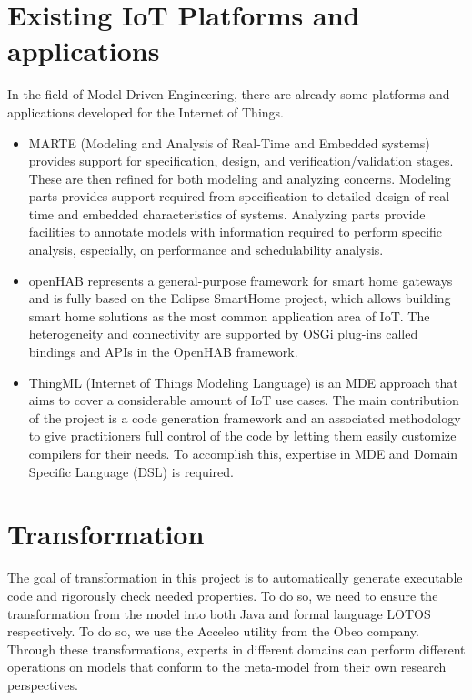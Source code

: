 \documentclass[11pt, oneside]{article}   	%
\begin{document}
\section {Existing IoT Platforms and applications}
\indent \par In the field of Model-Driven Engineering, there are already some platforms and applications developed for the Internet of Things.
\begin{itemize}
\item MARTE (Modeling and Analysis of Real-Time and Embedded systems)\cite{ref5} provides support for specification, design, and verification/validation stages. These are then refined for both modeling and analyzing concerns. Modeling parts provides support required from specification to detailed design of real-time and embedded characteristics of systems. Analyzing parts provide facilities to annotate models with information required to perform specific analysis, especially, on performance and schedulability analysis.
\item openHAB\cite{ref9} represents a general-purpose framework for smart home gateways and is fully based on the Eclipse SmartHome project, which allows building smart home solutions as the most common application area of IoT. The heterogeneity and connectivity are supported by OSGi plug-ins called bindings and APIs in the OpenHAB framework.
\item ThingML (Internet of Things Modeling Language)\cite{ref18}  is an MDE approach that aims to cover a considerable amount of IoT use cases. The main contribution of the project is a code generation framework and an associated methodology to give practitioners full control of the code by letting them easily customize compilers for their needs. To accomplish this, expertise in MDE and Domain Specific Language (DSL) is required.
\end{itemize}



\section{Transformation}
\indent \par The goal of transformation in this project is to automatically generate executable code and rigorously check needed properties. To do so, we  need to ensure the transformation from the model into both Java and formal language LOTOS respectively. To do so, we use the Acceleo\cite{ref21} utility from the Obeo company. Through  these transformations, experts in different domains can perform different operations on models that conform to the meta-model from their own research perspectives. 
\end{document}
